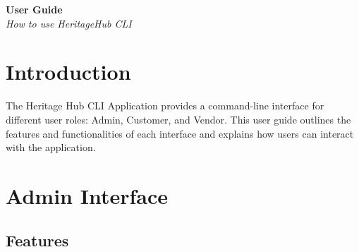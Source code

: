 \documentclass[12pt]{article}
\begin{document}
\renewcommand{\familydefault}{\rmdefault}

\pagebreak

    \hspace{0pt}
    \vfill
    \begin{center}
        \Huge \textbf{User Guide} \\
        \vspace*{5pt}
        \Large \textit{How to use HeritageHub CLI}
    \end{center}
    \vfill
    \pagebreak
\newpage

\section{Introduction}
The Heritage Hub CLI Application provides a command-line interface for different user roles: Admin, Customer, and Vendor. This user guide outlines the features and functionalities of each interface and explains how users can interact with the application.

\section{Admin Interface}

\subsection{Features}
\end{document}
